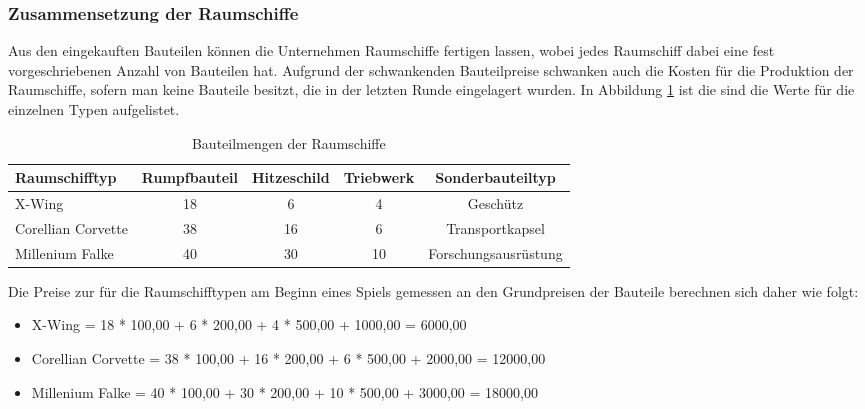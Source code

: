 \subsubsection{Zusammensetzung der Raumschiffe}
\label{subsub:spielwelt-datenbasis-raumschiffe-zusammensetzung}

Aus den eingekauften Bauteilen können die Unternehmen Raumschiffe fertigen lassen, wobei jedes Raumschiff dabei eine fest vorgeschriebenen Anzahl von Bauteilen hat. Aufgrund der schwankenden Bauteilpreise schwanken auch die Kosten für die Produktion der Raumschiffe, sofern man keine Bauteile besitzt, die in der letzten Runde eingelagert wurden. In Abbildung \ref{tab:spielwelt-datenbasis-raumschiffe-zusammensetzung} ist die sind die Werte für die einzelnen Typen aufgelistet.

\begin{table}[ht]\small
     \centering
     \begin{tabular}{ | l | c | c | c | c |  }
          \hline
          Raumschifftyp & Rumpfbauteil & Hitzeschild & Triebwerk & Sonderbauteiltyp \\
          \hline \hline
          X-Wing & 18 & 6 & 4 & Geschütz\\ \hline
          Corellian Corvette & 38 & 16 & 6 & Transportkapsel \\ \hline
          Millenium Falke & 40 & 30 & 10 & Forschungsausrüstung \\
          \hline
     \end{tabular}
     \caption{Bauteilmengen der Raumschiffe}
     \label{tab:spielwelt-datenbasis-raumschiffe-zusammensetzung}
\end{table}

Die Preise zur für die Raumschifftypen am Beginn eines Spiels gemessen an den Grundpreisen der Bauteile berechnen sich daher wie folgt:

\begin{itemize}
\item[] X-Wing             = 18 * 100,00\curr{} +  6 * 200,00\curr{} +  4 * 500,00\curr{} + 1000,00\curr{} =  6000,00\curr{}
\item[] Corellian Corvette = 38 * 100,00\curr{} + 16 * 200,00\curr{} +  6 * 500,00\curr{} + 2000,00\curr{} = 12000,00\curr{}
\item[] Millenium Falke    = 40 * 100,00\curr{} + 30 * 200,00\curr{} + 10 * 500,00\curr{} + 3000,00\curr{} = 18000,00\curr{}
\end{itemize}


